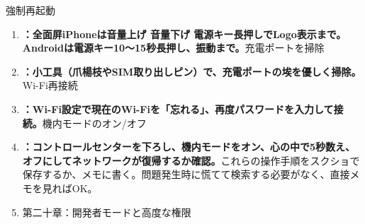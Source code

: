 \begin{tcbpractice}{強制再起動}
\begin{enumerate}
  \item \textbf{：全面屏iPhoneは音量上げ 音量下げ 電源キー長押しでLogo表示まで。Androidは電源キー10〜15秒長押し、振動まで。}充電ポートを掃除
  \item \textbf{：小工具（爪楊枝やSIM取り出しピン）で、充電ポートの埃を優しく掃除。}Wi-Fi再接続
  \item \textbf{：Wi-Fi設定で現在のWi-Fiを「忘れる」、再度パスワードを入力して接続。}機内モードのオン/オフ
  \item \textbf{：コントロールセンターを下ろし、機内モードをオン、心の中で5秒数え、オフにしてネットワークが復帰するか確認。}これらの操作手順をスクショで保存するか、メモに書く。問題発生時に慌てて検索する必要がなく、直接メモを見ればOK。
  \item 第二十章：開発者モードと高度な権限
\end{enumerate}

\end{tcbpractice}
